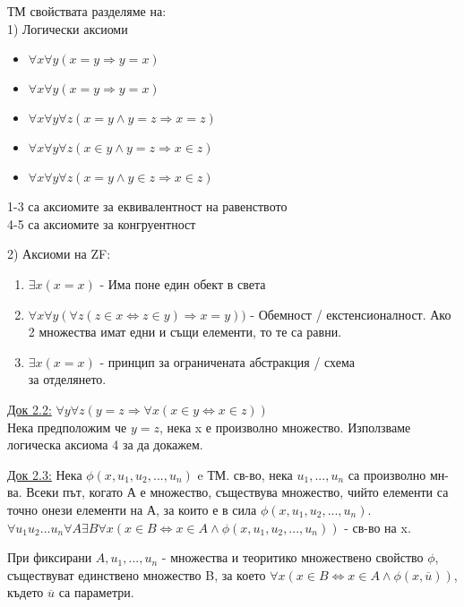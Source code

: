 \documentclass[fleqn, titlepage, 12pt]{report}
\begin{document}
ТМ свойствата разделяме на: \\
1) Логически аксиоми
\begin{itemize}
  \item $\forall{x}\forall{y}(x = y \Rightarrow y = x)$
  \item $\forall x \forall y (x = y \Rightarrow y = x)$
  \item $\forall{x}\forall{y}\forall{z}(x = y \land y = z \Rightarrow x = z)$
  \item $\forall{x}\forall{y}\forall{z}(x \in y \land y = z \Rightarrow x \in z)$
  \item $\forall{x}\forall{y}\forall{z}(x = y \land y \in z \Rightarrow x \in z)$
\end{itemize}
1-3 са аксиомите за еквивалентност на равенството\\
4-5 са аксиомите за конгруентност
\bigbreak

2) Аксиоми на ZF:
\begin{enumerate}
  \item $\exists{x}(x = x)$  - Има поне един обект в света
  \item $\forall{x}\forall{y}(\forall{z}(z \in x \Leftrightarrow z \in y) \Rightarrow x = y))$
- Обемност / екстенсионалност. Ако 2 множества имат едни и същи елементи, то те са равни.
  \item $\exists{x}(x = x)$ - принцип за ограничената абстракция / схема \\
    за отделянето.
\end{enumerate}
\underline{Док 2.2:} $\forall{y}\forall{z}(y = z \Rightarrow \forall{x}(x \in y \Leftrightarrow x \in z))$ \\
Нека предположим че $y = z$, нека x е произволно множество. Използваме логическа аксиома 4 за да докажем.
\bigbreak

\underline{Док 2.3:} Нека $\phi (x, u_1, u_2, ... , u_n)$ e ТМ. св-во, нека $u_1, ..., u_n$ са произволно мн-ва.
Всеки път, когато А е множество, съществува множество, чийто елементи са точно онези елементи на А, за които е в сила
$\phi (x, u_1, u_2, ..., u_n)$. \\
$\forall{u_1 u_2 ... u_n}\forall{A}\exists{B}\forall{x}(x \in B \Leftrightarrow x \in A \land \phi (x, u_1, u_2, ..., u_n))$ - св-во на x.
\bigbreak

 При фиксирани $A, u_1, ..., u_n$ - множества и теоритико множествено свойство $\phi$,\\
съществуват единствено множество B, за което
$\forall{x}(x \in B \Leftrightarrow x \in A \land \phi (x, \overline{u}))$, където $\overline{u}$ са параметри.
\bigbreak
\end{document}
